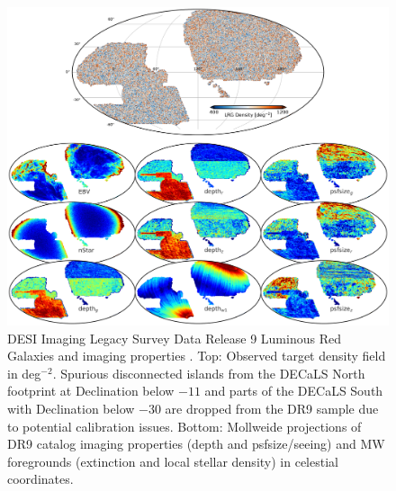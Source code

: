 \begin{figure}
    \centering
    \includegraphics[width=\textwidth]{figures/dr9data.pdf}
    \caption{DESI Imaging Legacy Survey Data Release 9 Luminous Red Galaxies and imaging properties \citep{dey2018overview}. Top: Observed target density field in deg$^{-2}$. Spurious disconnected islands from the DECaLS North footprint at Declination below $-11$ and parts of the DECaLS South with Declination below $-30$ are dropped from the DR9 sample due to potential calibration issues. Bottom: Mollweide projections of DR9 catalog imaging properties (depth and psfsize/seeing) and MW foregrounds (extinction and local stellar density) in celestial coordinates.}
    \label{fig:ng}
\end{figure}


